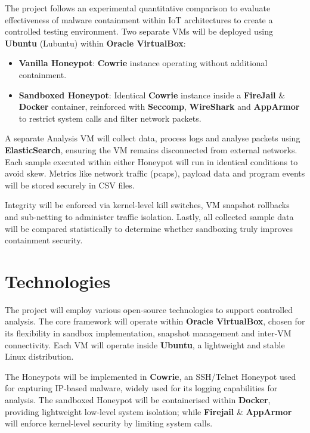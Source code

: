 \documentclass[a4paper,12pt,oneside]{book}			%
\begin{document}
The project follows an experimental quantitative comparison to evaluate effectiveness of malware containment within IoT architectures to create a controlled testing environment. Two separate VMs will be deployed using \textbf{Ubuntu} (Lubuntu) within \textbf{Oracle VirtualBox}:
\begin{itemize}
\item\textbf{Vanilla Honeypot}: \textbf{Cowrie} instance operating without additional containment.
\item\textbf{Sandboxed Honeypot}: Identical \textbf{Cowrie} instance inside a \textbf{FireJail} \& \textbf{Docker} container, reinforced with \textbf{Seccomp}, \textbf{WireShark} and \textbf{AppArmor} to restrict system calls and filter network packets.
\end{itemize}

A separate Analysis VM will collect data, process logs and analyse packets using \textbf{ElasticSearch}, ensuring the VM remains disconnected from external networks. Each sample executed within either Honeypot will run in identical conditions to avoid skew. Metrics like network traffic (pcaps), payload data and program events will be stored securely in CSV files.

Integrity will be enforced via kernel-level kill switches, VM snapshot rollbacks and sub-netting to administer traffic isolation. Lastly, all collected sample data will be compared statistically to determine whether sandboxing truly improves containment security. 


\section{Technologies}\label{sec:technologies}

The project will employ various open-source technologies to support controlled analysis. The core framework will operate within \textbf{Oracle VirtualBox}, chosen for its flexibility in sandbox implementation, snapshot management and inter-VM connectivity. Each VM will operate inside \textbf{Ubuntu}, a lightweight and stable Linux distribution.

The Honeypots will be implemented in \textbf{Cowrie}, an SSH/Telnet Honeypot used for capturing IP-based malware, widely used for its logging capabilities for analysis. The sandboxed Honeypot will be containerised within \textbf{Docker}, providing lightweight low-level system isolation; while \textbf{Firejail} \& \textbf{AppArmor}  will enforce kernel-level security by limiting system calls.
\end{document}
